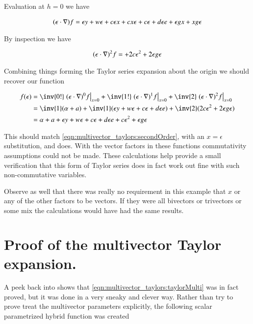 Evaluation at $h=0$ we have

\begin{align*}
(\epsilon \cdot \nabla) f
&=
\epsilon y 
+ w \epsilon
+ c \epsilon x 
+ c x \epsilon
+ c \epsilon 
+ d \epsilon e 
+ \epsilon g x 
+ x g \epsilon \\
\end{align*}

By inspection we have

\begin{align*}
(\epsilon \cdot \nabla)^2 f
&=
+ 2 c \epsilon^2
+ 2 \epsilon g \epsilon \\
\end{align*}

Combining things forming the Taylor series expansion about the origin we should recover our function

\begin{align*}
f(\epsilon) 
&= \inv{0!} \left. (\epsilon \cdot \grad)^0 f \right\vert_{x=0} 
+ \inv{1!} \left. (\epsilon \cdot \grad)^1 f \right\vert_{x=0} 
+ \inv{2} \left. (\epsilon \cdot \grad)^2 f \right\vert_{x=0} \\
&= \inv{1} (\alpha + a) + \inv{1} (\epsilon y + w \epsilon + c \epsilon + d \epsilon e ) + \inv{2}(2 c \epsilon^2 + 2 \epsilon g \epsilon ) \\
&= \alpha + a + \epsilon y + w \epsilon + c \epsilon + d \epsilon e + c \epsilon^2 + \epsilon g \epsilon \\
\end{align*}

This should match \ref{eqn:multivector_taylors:secondOrder}, with an $x = \epsilon$ substitution, and does.  With the vector factors in these functions commutativity 
assumptions could not be made.  These calculations 
help provide a small verification that this form
of Taylor series does in fact work out fine with such non-commutative variables.

Observe as well that there was really no requirement in this example that $x$ or any of the other factors to be vectors.  If they were all bivectors or trivectors or some mix the calculations would have had the same results.

\section{Proof of the multivector Taylor expansion. }

A peek back into \citep{hestenes1999nfc} shows that 
\ref{eqn:multivector_taylors:taylorMulti} was in fact proved, but it was done in a very
sneaky and clever way.  Rather than try to prove treat the multivector
parameters explicitly, the following scalar parametrized hybrid function
was created

